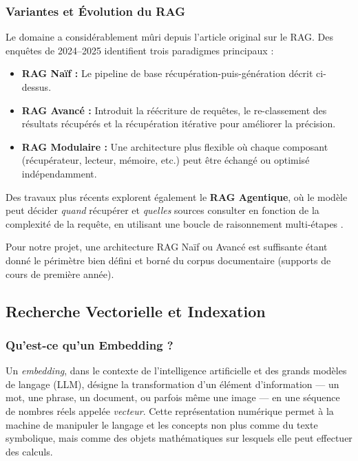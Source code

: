 \documentclass[a4paper,11pt]{article}
\begin{document}
\subsubsection{Variantes et Évolution du RAG}

Le domaine a considérablement mûri depuis l'article original sur le RAG.
Des enquêtes de 2024--2025 identifient trois paradigmes principaux
\cite{gao2024rag} :

\begin{itemize}
  \item \textbf{RAG Naïf :} Le pipeline de base récupération-puis-génération
    décrit ci-dessus.
  \item \textbf{RAG Avancé :} Introduit la réécriture de requêtes, le
    re-classement des résultats récupérés et la récupération itérative pour
    améliorer la précision.
  \item \textbf{RAG Modulaire :} Une architecture plus flexible où chaque
    composant (récupérateur, lecteur, mémoire, etc.) peut être échangé ou
    optimisé indépendamment.
\end{itemize}

Des travaux plus récents explorent également le \textbf{RAG Agentique}, où le
modèle peut décider \emph{quand} récupérer et \emph{quelles} sources consulter
en fonction de la complexité de la requête, en utilisant une boucle de
raisonnement multi-étapes \cite{zhao2024rag}.

Pour notre projet, une architecture RAG Naïf ou Avancé est suffisante étant
donné le périmètre bien défini et borné du corpus documentaire (supports de
cours de première année).

\subsection{Recherche Vectorielle et Indexation}

\subsubsection{Qu'est-ce qu'un Embedding ?}

Un \emph{embedding}, dans le contexte de l'intelligence artificielle et des
grands modèles de langage (LLM), désigne la transformation d'un élément
d'information --- un mot, une phrase, un document, ou parfois même une image
--- en une séquence de nombres réels appelée \emph{vecteur}. Cette
représentation numérique permet à la machine de manipuler le langage et les
concepts non plus comme du texte symbolique, mais comme des objets
mathématiques sur lesquels elle peut effectuer des calculs.
\end{document}
